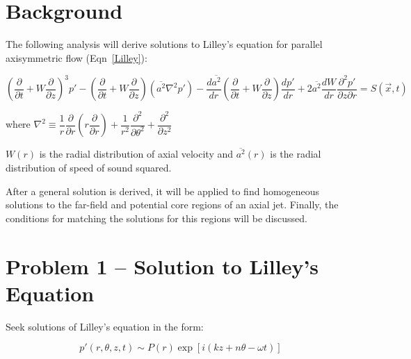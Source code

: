 \documentclass[]{aiaa-tc}%
\begin{document}
\section{Background} %

The following analysis will derive solutions to Lilley's equation for parallel axisymmetric flow (Eqn~\ref{Lilley}):

\begin{equation} \label{Lilley}
\left( \dfrac{\partial}{\partial t} + W \dfrac{\partial}{\partial z} \right)^3 p'
- \left( \dfrac{\partial}{\partial t} + W \dfrac{\partial}{\partial z} \right) \left( \overline{a^2} \nabla^2p' \right)
- \dfrac{d \overline{a^2}}{dr} \left( \dfrac{\partial}{\partial t} + W \dfrac{\partial}{\partial z} \right) \dfrac{dp'}{dr}
+ 2\overline{a^2} \dfrac{dW}{dr}\dfrac{\partial^2 p'}{\partial z \partial r}
= S(\vec{x}, t)
\end{equation}

\begin{center}
where $\nabla^2 \equiv \dfrac{1}{r}\dfrac{\partial}{\partial r} \left( r\dfrac{\partial}{\partial r} \right)
+ \dfrac{1}{r^2}\dfrac{\partial^2}{\partial \theta^2}
+ \dfrac{\partial^2}{\partial z^2}$
\end{center}


$W(r)$ is the radial distribution of axial velocity and $\overline{a^2}(r)$ is the radial distribution of speed of sound squared.

After a general solution is derived, it will be applied to find homogeneous solutions to the far-field and potential core regions of an axial jet.  Finally, the conditions for matching the solutions for this regions will be discussed.



\section{Problem 1 -- Solution to Lilley's Equation} %

Seek solutions of Lilley's equation in the form:

\begin{equation} \label{SolnForm}
p'(r, \theta, z, t) \sim P(r) \exp\left[ i(kz + n\theta -\omega t) \right]
\end{equation}
\end{document}
